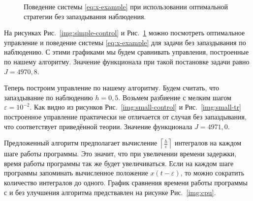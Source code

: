 \begin{figure}[bh]
        \noindent{}
        \caption{Поведение системы \eqref{eq:x-example} при использовании оптимальной стратегии без запаздывания наблюдения.}
        \label{img:simple-tr}
\end{figure}

На рисунках Рис.~\ref{img:simple-control} и Рис.~\ref{img:simple-tr} можно посмотреть оптимальное управление и поведение системы \eqref{eq:x-example} для задачи без запаздывания по наблюдению. С этими графиками мы будем сравнивать управления, построенные по нашему алгоритму. Значение функционала при такой постановке задачи равно $J = 4970,\!8$.

Теперь построим управление по нашему алгоритму. Будем считать, что запаздывание по наблюдению $h = 0,\!5$. Возьмем разбиение с мелким шагом $\varepsilon = 10^{-2}$. Как видно из рисунков Рис.~\ref{img:small-control} и Рис.~\ref{img:small-tr} построенное управление практически не отличается от случая без запаздывания, что соответствует приведённой теории. Значение функционала $J = 4971,\!0$.

Предложенный алгоритм предполагает вычисление $\left\lceil\frac{h}{\varepsilon}\right\rceil$ интегралов на каждом шаге работы программы. Это значит, что при увеличении времени задержки, время работы программы так же будет увеличиваться. Если на каждом шаге программы запоминать вычисленное положение $x(t - \varepsilon)$, то можно сократить количество интегралов до одного. График сравнения времени работы программы с и без улучшения алгоритма предствавлен на рисунке Рис.~\ref{img:cpu}.

